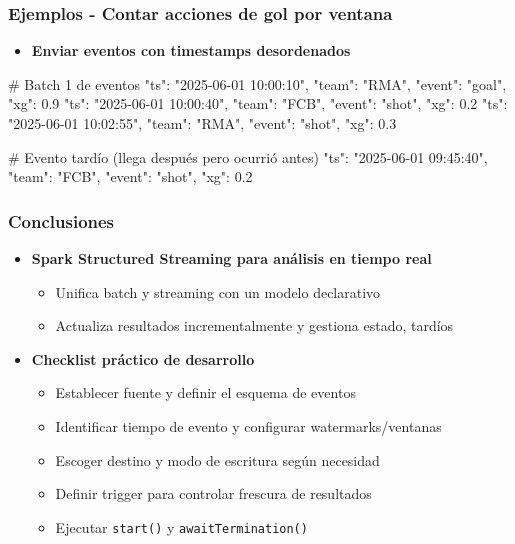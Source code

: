 \documentclass[aspectratio=169]{beamer}
\begin{document}
\begin{frame}[fragile]\frametitle{Ejemplos - Contar acciones de gol por ventana}

\begin{itemize}
	\item \textbf{Enviar eventos con timestamps desordenados}
\end{itemize}

\vspace{0.5em}

\begin{shellbox}
\begin{shcode}
# Batch 1 de eventos
{"ts": "2025-06-01 10:00:10", "team": "RMA", "event": "goal", "xg": 0.9}
{"ts": "2025-06-01 10:00:40", "team": "FCB", "event": "shot", "xg": 0.2}
{"ts": "2025-06-01 10:02:55", "team": "RMA", "event": "shot", "xg": 0.3}
\end{shcode}
\end{shellbox}

\begin{shellbox}
\begin{shcode}
# Evento tardío (llega después pero ocurrió antes)
{"ts": "2025-06-01 09:45:40", "team": "FCB", "event": "shot", "xg": 0.2}
\end{shcode}
\end{shellbox}
\end{frame}


\begin{frame}\frametitle{Conclusiones}
	\begin{itemize}
		\item \textbf{Spark Structured Streaming para análisis en tiempo real}
		\begin{itemize}
			\item Unifica batch y streaming con un modelo declarativo
			\item Actualiza resultados incrementalmente y gestiona estado, tardíos
		\end{itemize}

		\vspace{1em}

		\item \textbf{Checklist práctico de desarrollo}
		\begin{itemize}
			\item Establecer fuente y definir el esquema de eventos
			\item Identificar tiempo de evento y configurar watermarks/ventanas
			\item Escoger destino y modo de escritura según necesidad
			\item Definir trigger para controlar frescura de resultados
			\item Ejecutar \texttt{start()} y \texttt{awaitTermination()}
		\end{itemize}
	\end{itemize}
\end{frame}
\end{document}
